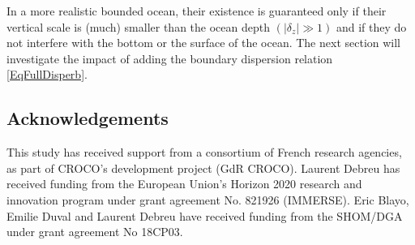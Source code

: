 \documentclass[a4paper,11pt]{article}
\begin{document}

In a more realistic bounded ocean, their existence is guaranteed only if their vertical scale is (much) smaller than the ocean depth $(|\delta_z| \gg 1)$ and if they do not interfere with the bottom or the surface of the ocean. The next section will investigate the impact of adding the boundary dispersion relation \ref{EqFullDisperb}.



\subsection*{Acknowledgements}
This study has received support from a consortium of French research agencies, as part of CROCO's development project (GdR CROCO). Laurent Debreu has received funding from the European Union's Horizon 2020 research and innovation program under grant agreement No. 821926 (IMMERSE). Eric Blayo, Emilie Duval and Laurent Debreu have received funding from the SHOM/DGA under grant agreement No 18CP03.




\end{document}

